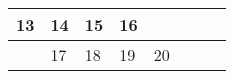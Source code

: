 {\begin{tabularx}{\linewidth}{|l!{\vrule width \myLenLineThicknessThick}*{7}{@{}X@{}|}}
        \begin{minipage}[t]{6mm}\centering{}13\end{minipage}
      
       & 
    
      
      
        \begin{minipage}[t]{6mm}\centering{}14\end{minipage}
      
       & 
    
      
      
        \begin{minipage}[t]{6mm}\centering{}15\end{minipage}
      
       & 
    
      
      
        \begin{minipage}[t]{6mm}\centering{}16\end{minipage}
      
      
        \\  \hline 
      
    
  
  
  
  \hyperlink{week-2025-46}{} &
    
      
      
        \begin{minipage}[t]{6mm}\centering{}17\end{minipage}
      
       & 
    
      
      
        \begin{minipage}[t]{6mm}\centering{}18\end{minipage}
      
       & 
    
      
      
        \begin{minipage}[t]{6mm}\centering{}19\end{minipage}
      
       & 
    
      
      
        \begin{minipage}[t]{6mm}\centering{}20\end{minipage}
      
       & 
    

\end{tabularx}}
